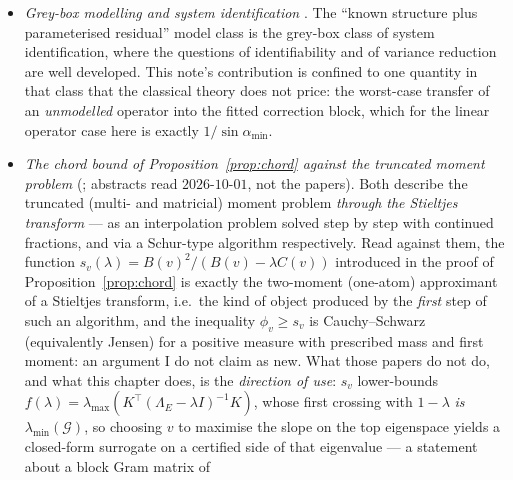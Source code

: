 \documentclass[11pt]{article}
\theoremstyle{remark}
\newcommand{\Gr}{\mathcal{G}}
\newcommand{\Le}{\Lambda_E}
\begin{document}
\begin{itemize}
\cite{frisch1933,lovell1963,ding2021}. Fitting the correction block after the prior block is, at the
level of the normal equations, residualisation: the estimator of $C$ is formed from the part of the
data that $P$ cannot explain, which is the content of that theorem, and \cite{ding2021} is the
standard care taken with the resulting standard errors. Our object is different in kind: FWL says
what the point estimate is, and this note bounds what an unmodelled operator $\Delta$ is \emph{forced}
to contribute to it, in the worst case, as a function of the dictionary's principal angles. The
distinction is stated because the two results are easy to conflate, and a reader who conflates them
will conclude the leakage theorem is already in the regression literature.
\item \emph{Grey-box modelling and system identification} \cite{ljung2010}. The
``known structure plus parameterised residual'' model class is the grey-box class of system
identification, where the questions of identifiability and of variance reduction are well
developed. This note's contribution is confined to one quantity in that class that the classical
theory does not price: the worst-case transfer of an \emph{unmodelled} operator into the fitted
correction block, which for the linear operator case here is exactly $1/\sin\alpha_{\min}$.
\item \emph{The chord bound of Proposition~\ref{prop:chord} against the truncated moment problem}
(\cite{kovalyov2025,fritzsche2017}; abstracts read
$2026\text{-}10\text{-}01$, not the papers). Both describe the truncated (multi- and matricial) moment
problem \emph{through the Stieltjes transform} --- as an interpolation problem solved step by step with
continued fractions, and via a Schur-type algorithm respectively. Read against them, the function
$s_v(\lambda)=B(v)^{2}/(B(v)-\lambda C(v))$ introduced in the proof of Proposition~\ref{prop:chord} is
exactly the two-moment (one-atom)
approximant of a Stieltjes transform, i.e.\ the kind of object produced by the \emph{first} step of such
an algorithm, and the inequality $\phi_v\ge s_v$ is Cauchy--Schwarz (equivalently Jensen) for a positive
measure with prescribed mass and first moment: an argument I do not claim as new. What those papers do
not do, and what this chapter does, is the \emph{direction of use}: $s_v$ lower-bounds
$f(\lambda)=\lambda_{\max}(K^{\top}(\Le-\lambda I)^{-1}K)$, whose first crossing with $1-\lambda$
\emph{is} $\lambda_{\min}(\Gr)$, so choosing $v$ to maximise the slope on the top eigenspace yields a
closed-form surrogate on a certified side of that eigenvalue --- a statement about a block Gram matrix of

\end{itemize}
\end{document}
